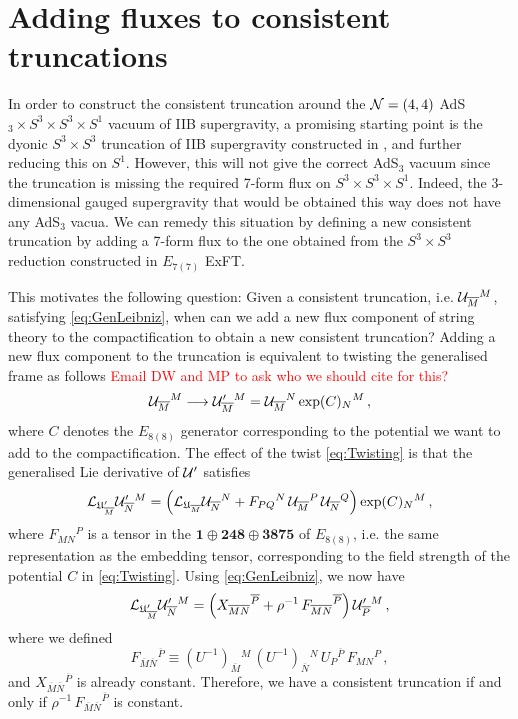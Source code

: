 \documentclass[a4paper, 11pt]{article}
\numberwithin{equation}{section}
\newcommand{\ff}[1]{\mathfrak{#1}}
\newcommand{\ov}[1]{\overline{#1}}
\newcommand{\EE}{\ensuremath{E_{8(8)}}\xspace}
\newcommand{\En}[1]{E_{#1(#1)}}
\newcommand{\+}{\oplus}
\newcommand{\gL}{\mathcal{L}}
\newcommand{\cU}{{\cal U}}
\newcommand{\UI}{\left(U^{-1}\right)}
\newcommand{\fl}[1]{\ov{#1}}
\newcommand{\EM}[1]{\textcolor{red}{#1}}
\begin{document}
\section{Adding fluxes to consistent truncations} \label{s:AddFlux}
In order to construct the consistent truncation around the ${\cal N}=(4,4)$ AdS$_3 \times S^3 \times S^3 \times S^1$ vacuum of IIB supergravity, a promising starting point is the dyonic $S^3 \times S^3$ truncation of IIB supergravity constructed in \cite{Inverso:2016eet}, and further reducing this on $S^1$. However, this will not give the correct AdS$_3$ vacuum since the truncation is missing the required 7-form flux on $S^3 \times S^3 \times S^1$. Indeed, the 3-dimensional gauged supergravity that would be obtained this way does not have any AdS$_3$ vacua. We can remedy this situation by defining a new consistent truncation by adding a 7-form flux to the one obtained from the $S^3 \times S^3$ reduction constructed in $\En{7}$ ExFT.

This motivates the following question: Given a consistent truncation, i.e. $\cU_{\fl{M}}{}^M$, satisfying \eqref{eq:GenLeibniz}, when can we add a new flux component of string theory to the compactification to obtain a new consistent truncation? Adding a new flux component to the truncation is equivalent to twisting the generalised frame as follows \EM{Email DW and MP to ask who we should cite for this?}
\begin{equation} \label{eq:Twisting}
	\cU_{\fl{M}}{}^M \longrightarrow \cU'_{\fl{M}}{}^M = \cU_{\fl{M}}{}^N \exp(C)_N{}^M \,,
\end{equation}
where $C$ denotes the $\EE$ generator corresponding to the potential we want to add to the compactification. The effect of the twist \eqref{eq:Twisting} is that the generalised Lie derivative of $\cU'$ satisfies
\begin{equation}
	\gL_{\ff{U}'_{\fl{M}}} \cU'_{\fl{N}}{}^M = \left( \gL_{\ff{U}_{\fl{M}}} \cU_{\fl{N}}{}^N + F_{PQ}{}^N\, \cU_{\fl{M}}{}^P\, \cU_{\fl{N}}{}^Q \right) \exp(C)_N{}^M \,,
\end{equation}
where $F_{MN}{}^P$ is a tensor in the $\mathbf{1} \oplus \mathbf{248} \oplus \mathbf{3875}$ of $\EE$, i.e. the same representation as the embedding tensor, corresponding to the field strength of the potential $C$ in \eqref{eq:Twisting}. Using \eqref{eq:GenLeibniz}, we now have
\begin{equation}
	\gL_{\ff{U}'_{\fl{M}}} \cU'_{\fl{N}}{}^M = \left( X_{\fl{M}\fl{N}}{}^{\fl{P}} + \rho^{-1}\, F_{\fl{M}\fl{N}}{}^{\fl{P}} \right) \cU'_{\fl{P}}{}^M \,,
\end{equation}
where we defined
\begin{equation} \label{eq:FlatF}
	F_{\fl{M}\fl{N}}{}^{\fl{P}} \equiv \UI_{\fl{M}}{}^M\, \UI_{\fl{N}}{}^N\, U_P{}^{\fl{P}}\, F_{MN}{}^P \,,
\end{equation}
and $X_{\fl{M}\fl{N}}{}^{\fl{P}}$ is already constant. Therefore, we have a consistent truncation if and only if $\rho^{-1}\, F_{\fl{M}\fl{N}}{}^{\fl{P}}$ is constant.
\end{document}
